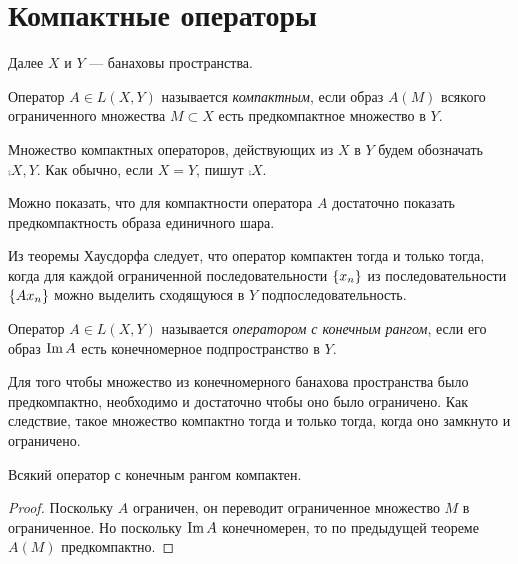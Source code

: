 \section{Компактные операторы}
Далее $X$ и $Y$ --- банаховы пространства.

\begin{definition}
    Оператор $A \in L(X, Y)$ называется \emph{компактным}, если образ $A(M)$ всякого ограниченного
    множества $M \subset X$ есть предкомпактное множество в $Y$.

    Множество компактных операторов, действующих из $X$ в $Y$ будем обозначать
     $\comp{X,Y}$. Как обычно, если $X = Y$, пишут $\comp{X}$.
\end{definition}

Можно показать, что для компактности оператора $A$ достаточно показать предкомпактность образа
единичного шара.

\begin{remark}
Из теоремы Хаусдорфа следует, что оператор компактен тогда и только тогда, когда для каждой
ограниченной последовательности $\left\{x_n\right\}$ из последовательности $\left\{Ax_n\right\}$ можно выделить
сходящуюся в $Y$ подпоследовательность.
\end{remark}

\begin{definition}
    Оператор $A \in L(X, Y)$ называется \emph{оператором с конечным рангом}, если его образ
    $\operatorname{Im} A$ есть конечномерное подпространство в $Y$.
\end{definition}

\begin{theorem}
    Для того чтобы множество из конечномерного банахова пространства было предкомпактно,
    необходимо и достаточно чтобы оно было ограничено. Как следствие, такое множество компактно
    тогда и только тогда, когда оно замкнуто и ограничено.
\end{theorem}

\begin{theorem}
    Всякий оператор с конечным рангом компактен.
\end{theorem}

\begin{proof}
    Поскольку $A$ ограничен, он переводит ограниченное множество $M$ в ограниченное. Но поскольку
    $\operatorname{Im} A$ конечномерен, то по предыдущей теореме $A(M)$ предкомпактно.
\end{proof}

